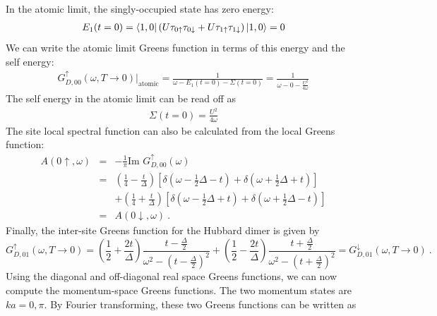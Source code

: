 \documentclass[prb]{revtex4-2}
\begin{document}
In the atomic limit, the singly-occupied state has zero energy:
\begin{equation}\begin{aligned}
	E_1(t=0) = \bra{1,0}\left(U \tau_{0 \uparrow}\tau_{0 \downarrow} + U \tau_{1 \uparrow}\tau_{1 \downarrow}\right) \ket{1,0} = 0
\end{aligned}\end{equation}
We can write the atomic limit Greens function in terms of this energy and the self energy:
\begin{equation}\begin{aligned}
	G_{D,00}^\uparrow(\omega, T \to 0) \bigg\vert_\text{atomic} = \frac{1}{\omega - E_1(t=0) - \Sigma(t=0)} = \frac{1}{\omega - 0 -\frac{U^2}{4\omega}}
\end{aligned}\end{equation}
The self energy in the atomic limit can be read off as 
\begin{equation}\begin{aligned}
	\label{dimer_selfenergy}
\Sigma(t=0) = \frac{U^2}{4\omega}
\end{aligned}\end{equation}
The site local spectral function can also be calculated from the local Greens function:
\begin{eqnarray}
A(0\uparrow, \omega) &=& - \frac{1}{\pi}\text{Im }G_{D,00}^\uparrow(\omega)\nonumber\\
			     &=& \left( \frac{1}{4} - \frac{t}{\Delta} \right)\left[\delta(\omega - \frac{1}{2}\Delta - t) + \delta(\omega + \frac{1}{2}\Delta + t)\right]\nonumber\\ 
			     &&+ \left( \frac{1}{4} + \frac{t}{\Delta} \right) \left[\delta(\omega - \frac{1}{2}\Delta + t) + \delta(\omega + \frac{1}{2}\Delta - t)\right]\\ 
			     &=& A(0\downarrow, \omega)~.\nonumber
\end{eqnarray}
Finally, the inter-site Greens function for the Hubbard dimer is given by
\begin{equation}
\label{dimer_intersite_G}
G_{D,01}^\uparrow(\omega, T \to 0) = \left( \frac{1}{2} + \frac{2t}{\Delta} \right) \frac{t - \frac{\Delta}{2}}{\omega^2 - \left(t - \frac{\Delta}{2}\right)^2} + \left( \frac{1}{2} - \frac{2t}{\Delta} \right) \frac{t + \frac{\Delta}{2}}{\omega^2 - \left(t + \frac{\Delta}{2}\right)^2} = G_{D,01}^\downarrow(\omega, T \to 0)~.
\end{equation}
Using the diagonal and off-diagonal real space Greens functions, we can now compute the momentum-space Greens functions. The two momentum states are $ka = 0, \pi$. By Fourier transforming, these two Greens functions can be written as
\end{document}
